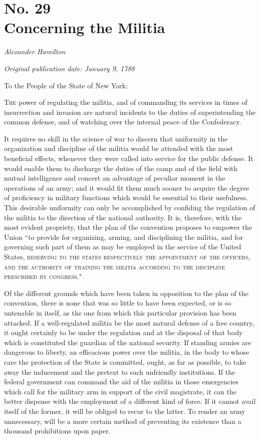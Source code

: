 \chapter[No. 29: Concerning the Militia]{No. 29\\ {\small Concerning the Militia}}

\textit{Alexander Hamilton}

\textit{Original publication date: January 9, 1788}
\vspace{1cm}

To the People of the State of New York:
\vspace{.4cm}

\textsc{The} power of regulating the militia, and of commanding its services in times of insurrection and invasion are natural incidents to the duties of superintending the common defense, and of watching over the internal peace of the Confederacy.

It requires no skill in the science of war to discern that uniformity in the organization and discipline of the militia would be attended with the most beneficial effects, whenever they were called into service for the public defense. 
It would enable them to discharge the duties of the camp and of the field with mutual intelligence and concert an advantage of peculiar moment in the operations of an army; and it would fit them much sooner to acquire the degree of proficiency in military functions which would be essential to their usefulness. 
This desirable uniformity can only be accomplished by confiding the regulation of the militia to the direction of the national authority. 
It is, therefore, with the most evident propriety, that the plan of the convention proposes to empower the Union ``to provide for organizing, arming, and disciplining the militia, and for governing such part of them as may be employed in the service of the United States, \textsc{reserving to the states respectively the appointment of the officers}, \textsc{and the authority of training the militia according to the discipline prescribed by congress}."

Of the different grounds which have been taken in opposition to the plan of the convention, there is none that was so little to have been expected, or is so untenable in itself, as the one from which this particular provision has been attacked. 
If a well-regulated militia be the most natural defense of a free country, it ought certainly to be under the regulation and at the disposal of that body which is constituted the guardian of the national security. 
If standing armies are dangerous to liberty, an efficacious power over the militia, in the body to whose care the protection of the State is committed, ought, as far as possible, to take away the inducement and the pretext to such unfriendly institutions. 
If the federal government can command the aid of the militia in those emergencies which call for the military arm in support of the civil magistrate, it can the better dispense with the employment of a different kind of force. 
If it cannot avail itself of the former, it will be obliged to recur to the latter. 
To render an army unnecessary, will be a more certain method of preventing its existence than a thousand prohibitions upon paper.

